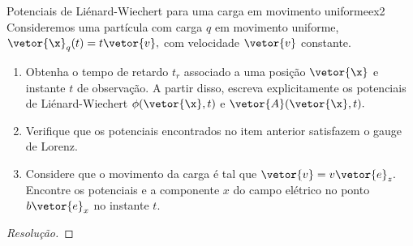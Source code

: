 \begin{exercício}{Potenciais de Liénard-Wiechert para uma carga em movimento uniforme}{ex2}
   Consideremos uma partícula com carga \(q\) em movimento uniforme, \(\vetor{\x}_q(t) = t\vetor{v},\) com velocidade \(\vetor{v}\) constante.
   \begin{enumerate}[label=(\alph*)]
      \item Obtenha o tempo de retardo \(t_r\) associado a uma posição \(\vetor{\x}\) e instante \(t\) de observação. A partir disso, escreva explicitamente os potenciais de Liénard-Wiechert \(\phi(\vetor{\x}, t)\) e \(\vetor{A}(\vetor{\x}, t).\)
      \item Verifique que os potenciais encontrados no item anterior satisfazem o gauge de Lorenz.
      \item Considere que o movimento da carga é tal que \(\vetor{v} = v \vetor{e}_z.\) Encontre os potenciais e a componente \(x\) do campo elétrico no ponto \(b\vetor{e}_x\) no instante \(t\).
   \end{enumerate}
\end{exercício}
\begin{proof}[Resolução]
    
\end{proof}
